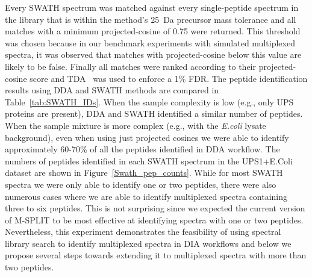 \documentclass[arial,11pt]{article}
\begin{document}
Every SWATH spectrum was matched against every single-peptide spectrum in the library that is within the method's 25~Da precursor mass tolerance and all matches with a minimum projected-cosine of 0.75 were returned. This threshold was chosen because in our benchmark experiments with simulated multiplexed spectra, it was observed that matches with projected-cosine below this value are likely to be false. Finally all matches were ranked according to their projected-cosine score and TDA~\cite{lamdecoylib} was used to enforce a 1\% FDR.  The peptide identification results using DDA and SWATH methods are compared in Table~\ref{tab:SWATH_IDs}. When the sample complexity is low (e.g., only UPS proteins are present),  DDA and SWATH identified a similar number of peptides.  When the sample mixture is more complex (e.g., with the {\em E.coli} lysate background), even when using just projected cosines %
we were able to identify approximately 60-70\% of all the peptides identified in DDA workflow.
The numbers of peptides identified in each SWATH spectrum in the UPS1+E.Coli dataset are shown in Figure~\ref{Swath_pep_counts}.   While for most SWATH spectra we were only able to identify one or two peptides, there were also numerous cases where we are able to identify multiplexed spectra containing three to six peptides. This is not surprising since we expected the current version of M-SPLIT to be most effective at identifying spectra with one or two peptides. %
Nevertheless, this experiment demonstrates the feasibility of using spectral library search to identify multiplexed spectra in DIA workflows and below we propose several steps towards extending it to multiplexed spectra with more than two peptides.
\end{document}
